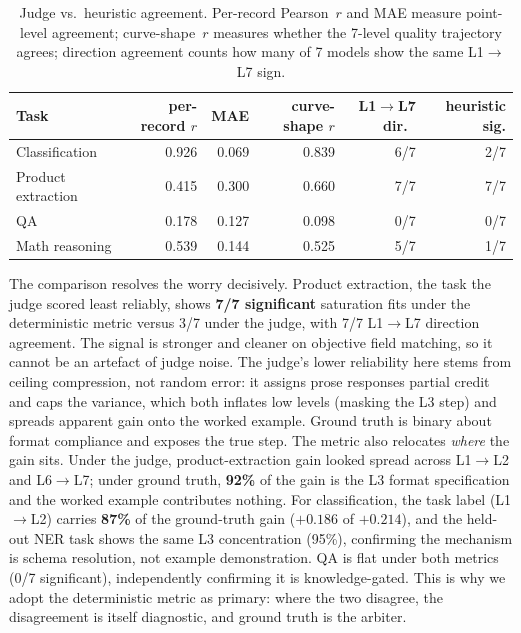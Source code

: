 \begin{table}[t]
\centering
\caption{Judge vs.\ heuristic agreement. Per-record Pearson~$r$ and MAE
  measure point-level agreement; curve-shape~$r$ measures whether the
  7-level quality trajectory agrees; direction agreement counts how many
  of 7 models show the same L1$\to$L7 sign.}
\label{tab:heuristic-agreement}
\small
\begin{tabular}{lrrrrr}
\toprule
Task & per-record $r$ & MAE & curve-shape $r$ & L1$\to$L7 dir.\ & heuristic sig. \\
\midrule
Classification      & 0.926 & 0.069 & 0.839 & 6/7 & 2/7 \\
Product extraction  & 0.415 & 0.300 & 0.660 & 7/7 & 7/7 \\
QA                  & 0.178 & 0.127 & 0.098 & 0/7 & 0/7 \\
Math reasoning      & 0.539 & 0.144 & 0.525 & 5/7 & 1/7 \\
\bottomrule
\end{tabular}
\end{table}

The comparison resolves the worry decisively. Product extraction, the task the
judge scored least reliably, shows \textbf{7/7 significant} saturation fits under
the deterministic metric versus 3/7 under the judge, with 7/7 L1$\to$L7
direction agreement. The signal is stronger and cleaner on objective field
matching, so it cannot be an artefact of judge noise. The judge's lower
reliability here stems from ceiling compression, not random error: it assigns
prose responses partial credit and caps the variance, which both inflates low
levels (masking the L3 step) and spreads apparent gain onto the worked example.
Ground truth is binary about format compliance and exposes the true step.
The metric also relocates \emph{where} the gain sits. Under the judge,
product-extraction gain looked spread across L1$\to$L2 and L6$\to$L7; under
ground truth, \textbf{92\%} of the gain is the L3 format specification and the
worked example contributes nothing. For classification, the task label
(L1$\to$L2) carries \textbf{87\%} of the ground-truth gain ($+0.186$ of
$+0.214$), and the held-out NER task shows the same L3 concentration (95\%),
confirming the mechanism is schema resolution, not example demonstration. QA is
flat under both metrics (0/7 significant), independently confirming it is
knowledge-gated. This is why we adopt the deterministic metric as primary: where
the two disagree, the disagreement is itself diagnostic, and ground truth is the
arbiter.


